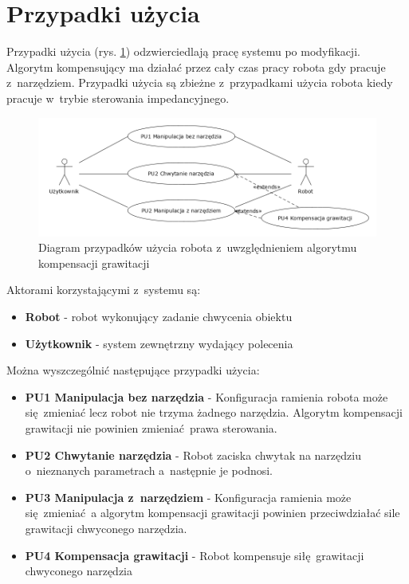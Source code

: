 \section{Przypadki użycia}
Przypadki użycia (rys. \ref{fig:usecase}) odzwierciedlają pracę systemu po modyfikacji. Algorytm kompensujący ma działać przez cały czas pracy robota gdy pracuje z~narzędziem. Przypadki użycia są zbieżne z~przypadkami użycia robota kiedy pracuje w~trybie sterowania impedancyjnego.

\begin{figure}[H]
	\centering
	\includegraphics[width=.9\textwidth]{images/usecase.png}
	\caption{Diagram przypadków użycia robota z~uwzględnieniem algorytmu kompensacji grawitacji}
	\label{fig:usecase}
\end{figure}


Aktorami korzystającymi z~systemu są:
\begin{itemize}
	\item \textbf{Robot} - robot wykonujący zadanie chwycenia obiektu
	\item \textbf{Użytkownik} - system zewnętrzny wydający polecenia
\end{itemize}


Można wyszczególnić następujące przypadki użycia:
\begin{itemize}
	\item \textbf{PU1 Manipulacja bez narzędzia} - Konfiguracja ramienia robota może się zmieniać lecz robot nie trzyma żadnego narzędzia. Algorytm kompensacji grawitacji nie powinien zmieniać prawa sterowania. 
	\item \textbf{PU2 Chwytanie narzędzia} - Robot zaciska chwytak na narzędziu o~nieznanych parametrach a~następnie je podnosi.  
	\item \textbf{PU3 Manipulacja z~narzędziem} - Konfiguracja ramienia może się zmieniać a algorytm kompensacji grawitacji powinien przeciwdziałać sile grawitacji chwyconego narzędzia.
	\item \textbf{PU4 Kompensacja grawitacji} - Robot kompensuje siłę grawitacji chwyconego narzędzia
\end{itemize}



